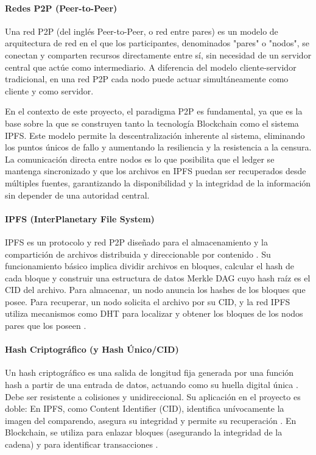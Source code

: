 \paragraph{Redes P2P (Peer-to-Peer)} 

 Una red P2P (del inglés Peer-to-Peer, o red entre pares) es un modelo de arquitectura de red en el que los participantes, denominados "pares" o "nodos", se conectan y comparten recursos directamente entre sí, sin necesidad de un servidor central que actúe como intermediario. A diferencia del modelo cliente-servidor tradicional, en una red P2P cada nodo puede actuar simultáneamente como cliente y como servidor. 

En el contexto de este proyecto, el paradigma P2P es fundamental, ya que es la base sobre la que se construyen tanto la tecnología Blockchain como el sistema IPFS. Este modelo permite la descentralización inherente al sistema, eliminando los puntos únicos de fallo y aumentando la resiliencia y la resistencia a la censura. La comunicación directa entre nodos es lo que posibilita que el ledger se mantenga sincronizado y que los archivos en IPFS puedan ser recuperados desde múltiples fuentes, garantizando la disponibilidad y la integridad de la información sin depender de una autoridad central. 
\paragraph{IPFS (InterPlanetary File System)} 

IPFS es un protocolo y red P2P diseñado para el almacenamiento y la compartición de archivos distribuida y direccionable por contenido \parencite{benet2014ipfs}. Su funcionamiento básico implica dividir archivos en bloques, calcular el hash de cada bloque y construir una estructura de datos Merkle DAG cuyo hash raíz es el CID del archivo. Para almacenar, un nodo anuncia los hashes de los bloques que posee. Para recuperar, un nodo solicita el archivo por su CID, y la red IPFS utiliza mecanismos como DHT \parencite{maymounkov2002kademlia} para localizar y obtener los bloques de los nodos pares que los poseen \parencite{benet2014ipfs}. 

\paragraph{Hash Criptográfico (y Hash Único/CID)} 

Un hash criptográfico es una salida de longitud fija generada por una función hash a partir de una entrada de datos, actuando como su huella digital única \parencite{menezes1996handbook}. Debe ser resistente a colisiones y unidireccional. Su aplicación en el proyecto es doble: En IPFS, como Content Identifier (CID), identifica unívocamente la imagen del comparendo, asegura su integridad y permite su recuperación \parencite{benet2014ipfs}. En Blockchain, se utiliza para enlazar bloques (asegurando la integridad de la cadena) y para identificar transacciones \parencite{nakamoto2008bitcoin}. 

